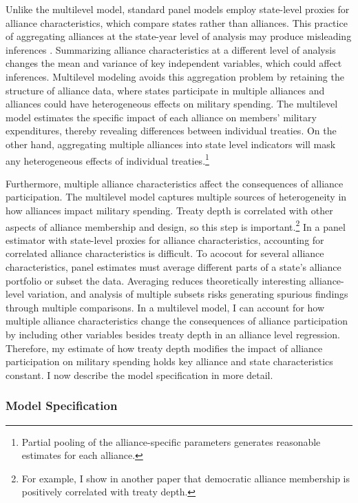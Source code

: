 \documentclass[12pt]{article}
\begin{document}
Unlike the multilevel model, standard panel models employ state-level proxies for alliance characteristics, which compare states rather than alliances.
This practice of aggregating alliances at the state-year level of analysis may produce misleading inferences \citep[pg. 356]{McElreath2016}.
Summarizing alliance characteristics at a different level of analysis changes the mean and variance of key independent variables, which could affect inferences. 
Multilevel modeling avoids this aggregation problem by retaining the structure of alliance data, where states participate in multiple alliances and alliances could have heterogeneous effects on military spending.
The multilevel model estimates the specific impact of each alliance on members' military expenditures, thereby revealing differences between individual treaties. 
On the other hand, aggregating multiple alliances into state level indicators will mask any heterogeneous effects of individual treaties.\footnote{Partial pooling of the alliance-specific parameters generates reasonable estimates for each alliance.} 


Furthermore, multiple alliance characteristics affect the consequences of alliance participation.
The multilevel model captures multiple sources of heterogeneity in how alliances impact military spending. 
Treaty depth is correlated with other aspects of alliance membership and design, so this step is important.\footnote{For example, I show in another paper that democratic alliance membership is positively correlated with treaty depth.}
In a panel estimator with state-level proxies for alliance characteristics, accounting for correlated alliance characteristics is difficult. 
To acocout for several alliance characteristics, panel estimates must average different parts of a state's alliance portfolio or subset the data.
Averaging reduces theoretically interesting alliance-level variation, and analysis of multiple subsets risks generating spurious findings through multiple comparisons.  
In a multilevel model, I can account for how multiple alliance characteristics change the consequences of alliance participation by including other variables besides treaty depth in an alliance level regression. 
Therefore, my estimate of how treaty depth modifies the impact of alliance participation on military spending holds key alliance and state characteristics constant. 
I now describe the model specification in more detail. 
 


\subsubsection{Model Specification} 
\end{document}
